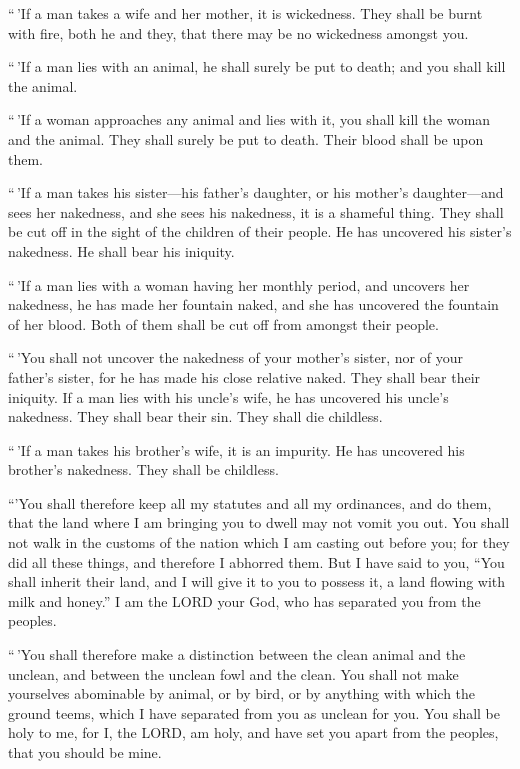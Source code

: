  ``\,'If a man takes a wife and her mother, it is
wickedness. They shall be burnt with fire, both he and they, that there
may be no wickedness amongst you.

 ``\,'If a man lies with an animal, he shall surely be put
to death; and you shall kill the animal.

 ``\,'If a woman approaches any animal and lies with it,
you shall kill the woman and the animal. They shall surely be put to
death. Their blood shall be upon them.

 ``\,'If a man takes his sister---his father's daughter, or
his mother's daughter---and sees her nakedness, and she sees his
nakedness, it is a shameful thing. They shall be cut off in the sight of
the children of their people. He has uncovered his sister's nakedness.
He shall bear his iniquity.

 ``\,'If a man lies with a woman having her monthly period,
and uncovers her nakedness, he has made her fountain naked, and she has
uncovered the fountain of her blood. Both of them shall be cut off from
amongst their people.

 ``\,'You shall not uncover the nakedness of your mother's
sister, nor of your father's sister, for he has made his close relative
naked. They shall bear their iniquity.  If a man lies with
his uncle's wife, he has uncovered his uncle's nakedness. They shall
bear their sin. They shall die childless.

 ``\,'If a man takes his brother's wife, it is an impurity.
He has uncovered his brother's nakedness. They shall be childless.

 ``'You shall therefore keep all my statutes and all my
ordinances, and do them, that the land where I am bringing you to dwell
may not vomit you out.  You shall not walk in the customs
of the nation which I am casting out before you; for they did all these
things, and therefore I abhorred them.  But I have said to
you, ``You shall inherit their land, and I will give it to you to
possess it, a land flowing with milk and honey.'' I am the LORD your
God, who has separated you from the peoples.

 ``\,'You shall therefore make a distinction between the
clean animal and the unclean, and between the unclean fowl and the
clean. You shall not make yourselves abominable by animal, or by bird,
or by anything with which the ground teems, which I have separated from
you as unclean for you.  You shall be holy to me, for I,
the LORD, am holy, and have set you apart from the peoples, that you
should be mine.

